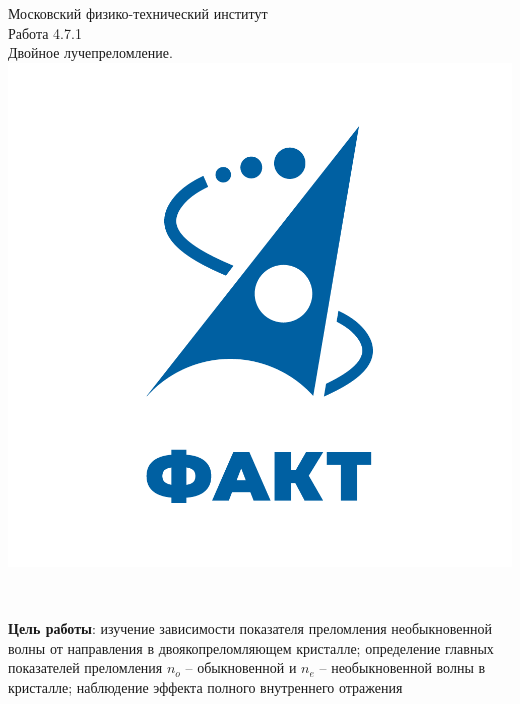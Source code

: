 
\usepackage{booktabs}
\usepackage{multirow}

\usepackage{wrapfig}



\begin{titlepage}
\begin{center}
	\large{Московский физико-технический институт}\\
	\vspace{100px}
	\LARGE{Работа 4.7.1}\\
	\LARGE{Двойное лучепреломление.}\\
	\vspace{30px}
	\includegraphics[scale = 0.3]{fakt_logo.png}\\
\end{center}

\vfill
\begin{flushright}
	\\
\end{flushright}
\end{titlepage}

\newpage

\tableofcontents

\newpage


\textbf{Цель работы}: изучение зависимости показателя преломления необыкновенной волны от направления в двоякопреломляющем кристалле; определение главных показателей преломления $n_o$ -- обыкновенной и $n_e$ -- необыкновенной волны в кристалле; наблюдение эффекта полного внутреннего отражения

